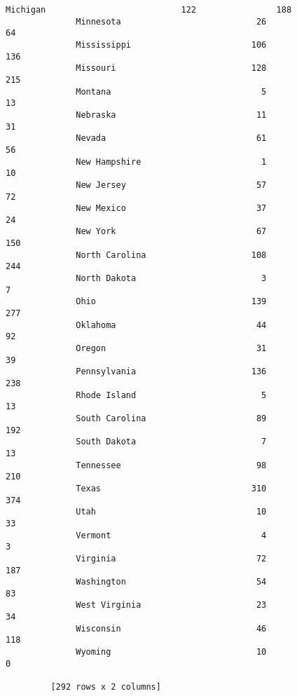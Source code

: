 \documentclass[11pt]{article}
\begin{document}
\begin{Verbatim}[commandchars=\\\{\}]
              Michigan                           122                188
              Minnesota                           26                 64
              Mississippi                        106                136
              Missouri                           128                215
              Montana                              5                 13
              Nebraska                            11                 31
              Nevada                              61                 56
              New Hampshire                        1                 10
              New Jersey                          57                 72
              New Mexico                          37                 24
              New York                            67                150
              North Carolina                     108                244
              North Dakota                         3                  7
              Ohio                               139                277
              Oklahoma                            44                 92
              Oregon                              31                 39
              Pennsylvania                       136                238
              Rhode Island                         5                 13
              South Carolina                      89                192
              South Dakota                         7                 13
              Tennessee                           98                210
              Texas                              310                374
              Utah                                10                 33
              Vermont                              4                  3
              Virginia                            72                187
              Washington                          54                 83
              West Virginia                       23                 34
              Wisconsin                           46                118
              Wyoming                             10                  0
         
         [292 rows x 2 columns]
\end{Verbatim}
            

    
    
    
    
\end{document}
